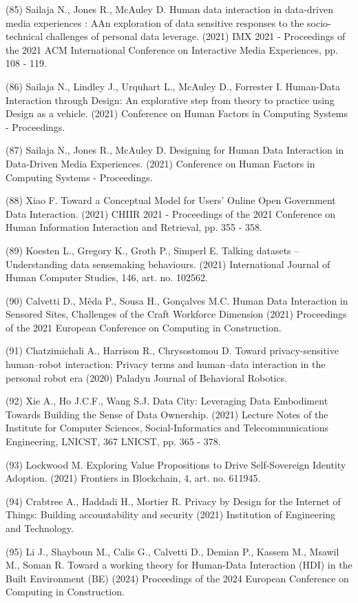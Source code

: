 \documentclass[
	12pt,				%
	oneside,			%
	a4paper,			%
	english,			%
	brazil				%
	]{abntex2ppgsi}
\begin{document}
\begin{apendicesenv}
(85) Sailaja N., Jones R., McAuley D. Human data interaction in data-driven media experiences : AAn exploration of data sensitive responses to the socio-technical challenges of personal data leverage. (2021) IMX 2021 - Proceedings of the 2021 ACM International Conference on Interactive Media Experiences, pp. 108 - 119.

(86) Sailaja N., Lindley J., Urquhart L., McAuley D., Forrester I. Human-Data Interaction through Design: An explorative step from theory to practice using Design as a vehicle. (2021) Conference on Human Factors in Computing Systems - Proceedings.

(87) Sailaja N., Jones R., McAuley D. Designing for Human Data Interaction in Data-Driven Media Experiences. (2021) Conference on Human Factors in Computing Systems - Proceedings.

(88) Xiao F. Toward a Conceptual Model for Users' Online Open Government Data Interaction. (2021) CHIIR 2021 - Proceedings of the 2021 Conference on Human Information Interaction and Retrieval, pp. 355 - 358.

(89) Koesten L., Gregory K., Groth P., Simperl E. Talking datasets – Understanding data sensemaking behaviours. (2021) International Journal of Human Computer Studies, 146, art. no. 102562.

(90) Calvetti D., Mêda P., Sousa H., Gonçalves M.C. Human Data Interaction in Sensored Sites, Challenges of the Craft Workforce Dimension (2021) Proceedings of the 2021 European Conference on Computing in Construction.

(91) Chatzimichali A., Harrison R., Chrysostomou D. Toward privacy-sensitive human–robot interaction: Privacy terms and human–data interaction in the personal robot era (2020) Paladyn Journal of Behavioral Robotics.

(92) Xie A., Ho J.C.F., Wang S.J. Data City: Leveraging Data Embodiment Towards Building the Sense of Data Ownership. (2021) Lecture Notes of the Institute for Computer Sciences, Social-Informatics and Telecommunications Engineering, LNICST, 367 LNICST, pp. 365 - 378.

(93) Lockwood M. Exploring Value Propositions to Drive Self-Sovereign Identity Adoption. (2021) Frontiers in Blockchain, 4, art. no. 611945.

(94) Crabtree A., Haddadi H., Mortier R. Privacy by Design for the Internet of Things: Building accountability and security (2021) Institution of Engineering and Technology.

(95) Li J., Shayboun M., Calis G., Calvetti D., Demian P., Kassem M., Msawil M., Soman R. Toward a working theory for Human-Data Interaction (HDI) in the Built Environment (BE) (2024) Proceedings of the 2024 European Conference on Computing in Construction.


\end{apendicesenv}
\end{document}
